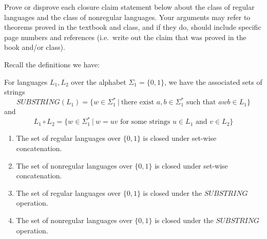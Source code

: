 \begin{enumerate}[wide, labelwidth=!, labelindent=0pt]
Prove or disprove each closure claim statement below about the class of regular languages
and the class of nonregular languages.
Your arguments may refer to theorems proved in the textbook and class, and if they do, should 
include specific page numbers and references (i.e.\ write out the claim that was proved in the book 
and/or class).

Recall the definitions we have: 

For languages $L_1, L_2$ over the alphabet $\Sigma_1 = \{0,1\}$, we have the 
associated sets of strings
\[
   SUBSTRING(L_1) = \{ w \in \Sigma_1^* ~|~ \text{there exist } a,b \in \Sigma_1^* \text{ such that } awb \in L_1\}
\]
and 
\[
   L_1 \circ L_2 = \{ w \in \Sigma_1^* ~|~ w = uv \text{ for some strings } u \in L_1 \text{ and } v \in L_2 \}
\]
\begin{enumerate}

    \item \gradeComplete The set of regular languages over $\{0,1\}$ is closed under set-wise concatenation.

    \item \gradeComplete The set of nonregular languages over $\{0,1\}$ is closed under set-wise concatenation.
 
   \item \gradeComplete The set of regular languages over $\{0,1\}$ is closed under the $SUBSTRING$ operation.

   \item \gradeComplete The set of nonregular languages over $\{0,1\}$ is closed under the $SUBSTRING$ operation.
\end{enumerate}
\end{enumerate}
